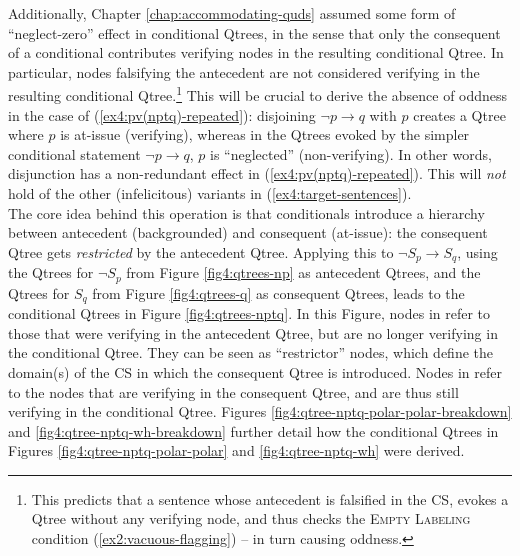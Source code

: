Additionally, Chapter \ref{chap:accommodating-quds} assumed some form of ``neglect-zero'' effect \citep{Aloni2022, Flachs2023} in conditional Qtrees, in the sense that only the consequent of a conditional contributes verifying nodes in the resulting conditional Qtree. In particular, nodes falsifying the antecedent are not considered verifying in the resulting conditional Qtree.\footnote{This predicts that a sentence whose antecedent is falsified in the CS, evokes a Qtree without any verifying node, and thus checks the \textsc{Empty Labeling} condition (\ref{ex2:vacuous-flagging}) -- in turn causing oddness.} This will be crucial to derive the absence of oddness in the case of (\ref{ex4:pv(nptq)-repeated}): disjoining $\neg p \rightarrow q$ with $p$ creates a Qtree where $p$ is at-issue (verifying), whereas in the Qtrees evoked by the simpler conditional statement $\neg p \rightarrow q$, $p$ is ``neglected'' (non-verifying). In other words, disjunction has a non-redundant effect in (\ref{ex4:pv(nptq)-repeated}). This will \textit{not} hold of the other (infelicitous) variants in (\ref{ex4:target-sentences}).\\


The core idea behind this operation is that conditionals introduce a hierarchy between antecedent (backgrounded) and consequent (at-issue): the consequent Qtree gets \textit{restricted} by the antecedent Qtree. Applying this to $\neg S_p \rightarrow S_q$, using the Qtrees for $\neg S_p$ from Figure \ref{fig4:qtrees-np} as antecedent Qtrees, and the Qtrees for $S_q$ from Figure \ref{fig4:qtrees-q} as consequent Qtrees, leads to the conditional Qtrees in Figure \ref{fig4:qtrees-nptq}. In this Figure, nodes in \setlength{\fboxsep}{1pt} refer to those that were verifying in the antecedent Qtree, but are no longer verifying in the conditional Qtree. They can be seen as ``restrictor'' nodes, which define the domain(s) of the CS in which the consequent Qtree is introduced. Nodes in \setlength{\fboxsep}{1pt} refer to the nodes that are verifying in the consequent Qtree, and are thus still verifying in the conditional Qtree. Figures \ref{fig4:qtree-nptq-polar-polar-breakdown} and \ref{fig4:qtree-nptq-wh-breakdown} further detail how the conditional Qtrees in Figures \ref{fig4:qtree-nptq-polar-polar} and \ref{fig4:qtree-nptq-wh} were derived.


